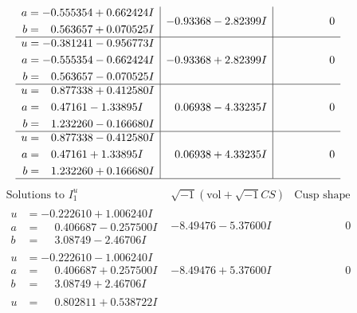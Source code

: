 \documentclass[1p]{elsarticle_modified}
\theoremstyle{definition}
\newcommand{\I}{\sqrt{-1}}
\begin{document}
$$\begin{array}{c|c|c}
\begin{aligned}
a &= -0.555354 + 0.662424 I \\
b &= \phantom{-}0.563657 + 0.070525 I\end{aligned}
 & -0.93368 - 2.82399 I & \phantom{-0.000000 } 0 \\ \hline\begin{aligned}
u &= -0.381241 - 0.956773 I \\
a &= -0.555354 - 0.662424 I \\
b &= \phantom{-}0.563657 - 0.070525 I\end{aligned}
 & -0.93368 + 2.82399 I & \phantom{-0.000000 } 0 \\ \hline\begin{aligned}
u &= \phantom{-}0.877338 + 0.412580 I \\
a &= \phantom{-}0.47161 - 1.33895 I \\
b &= \phantom{-}1.232260 - 0.166680 I\end{aligned}
 & \phantom{-}0.06938 - 4.33235 I & \phantom{-0.000000 } 0 \\ \hline\begin{aligned}
u &= \phantom{-}0.877338 - 0.412580 I \\
a &= \phantom{-}0.47161 + 1.33895 I \\
b &= \phantom{-}1.232260 + 0.166680 I\end{aligned}
 & \phantom{-}0.06938 + 4.33235 I & \phantom{-0.000000 } 0\\
 \hline 
 \end{array}$$\newpage$$\begin{array}{c|c|c}  
\text{Solutions to }I^u_{1}& \I (\text{vol} + \sqrt{-1}CS) & \text{Cusp shape}\\
 \hline 
\begin{aligned}
u &= -0.222610 + 1.006240 I \\
a &= \phantom{-}0.406687 - 0.257500 I \\
b &= \phantom{-}3.08749 - 2.46706 I\end{aligned}
 & -8.49476 - 5.37600 I & \phantom{-0.000000 } 0 \\ \hline\begin{aligned}
u &= -0.222610 - 1.006240 I \\
a &= \phantom{-}0.406687 + 0.257500 I \\
b &= \phantom{-}3.08749 + 2.46706 I\end{aligned}
 & -8.49476 + 5.37600 I & \phantom{-0.000000 } 0 \\ \hline\begin{aligned}
u &= \phantom{-}0.802811 + 0.538722 I \\

\end{aligned}
\end{array}$$
\end{document}
